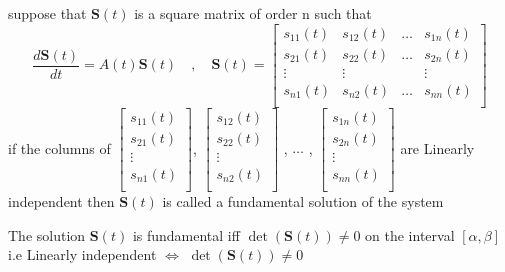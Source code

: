 \documentclass[]{article}
\begin{document}
suppose that $\mathbf{S}(t)$ is a square matrix of order n such that
\[
    \frac{d\mathbf{S}(t)}{dt} = A(t)\mathbf{S}(t)
    \quad , \quad
    \mathbf{S}(t) = \begin{bmatrix}
        s_{11}(t) & s_{12}(t) & \dots & s_{1n}(t) \\
        s_{21}(t) & s_{22}(t) & \dots & s_{2n}(t) \\
        \vdots    & \vdots    &       & \vdots    \\
        s_{n1}(t) & s_{n2}(t) & \dots & s_{nn}(t) \\
    \end{bmatrix}
\]
if the columns of
$
    \begin{bmatrix}
        s_{11}(t) \\
        s_{21}(t) \\
        \vdots    \\
        s_{n1}(t) \\
    \end{bmatrix}
$,
$
    \begin{bmatrix}
        s_{12}(t) \\
        s_{22}(t) \\
        \vdots    \\
        s_{n2}(t) \\
    \end{bmatrix}
$
,
$\dots$
,
$
    \begin{bmatrix}
        s_{1n}(t) \\
        s_{2n}(t) \\
        \vdots    \\
        s_{nn}(t) \\
    \end{bmatrix}
$
are Linearly independent then $\mathbf{S}(t)$ is called a fundamental solution
of the system

\begin{theorem}[]
    The solution $\mathbf{S}(t)$ is fundamental iff $\det(\mathbf{S}(t))\neq 0$ on the interval $[\alpha , \beta]$
    \\
    i.e Linearly independent $\Longleftrightarrow$ $\det(\mathbf{S}(t))\neq 0$
\end{theorem}
\end{document}
